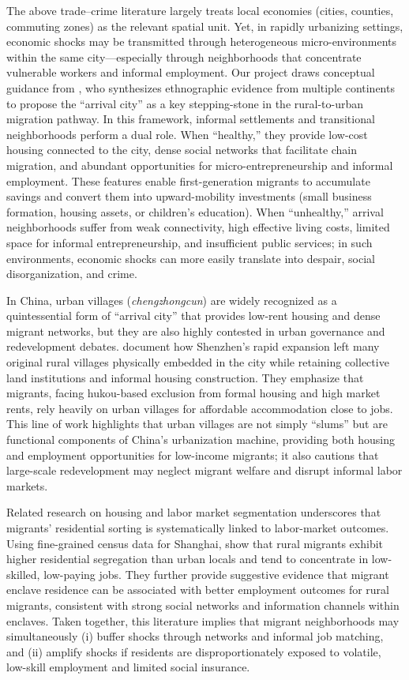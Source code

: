 The above trade--crime literature largely treats local economies (cities, counties, commuting zones) as the relevant spatial unit. Yet, in rapidly urbanizing settings, economic shocks may be transmitted through heterogeneous micro-environments within the same city---especially through neighborhoods that concentrate vulnerable workers and informal employment. Our project draws conceptual guidance from \citet{saunders2010arrival}, who synthesizes ethnographic evidence from multiple continents to propose the ``arrival city'' as a key stepping-stone in the rural-to-urban migration pathway. In this framework, informal settlements and transitional neighborhoods perform a dual role. When ``healthy,'' they provide low-cost housing connected to the city, dense social networks that facilitate chain migration, and abundant opportunities for micro-entrepreneurship and informal employment. These features enable first-generation migrants to accumulate savings and convert them into upward-mobility investments (small business formation, housing assets, or children's education). When ``unhealthy,'' arrival neighborhoods suffer from weak connectivity, high effective living costs, limited space for informal entrepreneurship, and insufficient public services; in such environments, economic shocks can more easily translate into despair, social disorganization, and crime.

In China, urban villages (\emph{chengzhongcun}) are widely recognized as a quintessential form of ``arrival city'' that provides low-rent housing and dense migrant networks, but they are also highly contested in urban governance and redevelopment debates. \citet{wang2009urbanization} document how Shenzhen's rapid expansion left many original rural villages physically embedded in the city while retaining collective land institutions and informal housing construction. They emphasize that migrants, facing hukou-based exclusion from formal housing and high market rents, rely heavily on urban villages for affordable accommodation close to jobs. This line of work highlights that urban villages are not simply ``slums'' but are functional components of China's urbanization machine, providing both housing and employment opportunities for low-income migrants; it also cautions that large-scale redevelopment may neglect migrant welfare and disrupt informal labor markets.

Related research on housing and labor market segmentation underscores that migrants' residential sorting is systematically linked to labor-market outcomes. Using fine-grained census data for Shanghai, \citet{liu2016segmentation} show that rural migrants exhibit higher residential segregation than urban locals and tend to concentrate in low-skilled, low-paying jobs. They further provide suggestive evidence that migrant enclave residence can be associated with better employment outcomes for rural migrants, consistent with strong social networks and information channels within enclaves. Taken together, this literature implies that migrant neighborhoods may simultaneously (i) buffer shocks through networks and informal job matching, and (ii) amplify shocks if residents are disproportionately exposed to volatile, low-skill employment and limited social insurance.

